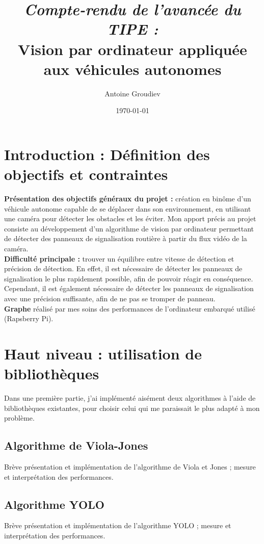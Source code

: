 \documentclass[12pt,a4paper]{article}
\author{Antoine Groudiev}
\title{\textit{Compte-rendu de l'avancée du TIPE :} \\ Vision par ordinateur appliquée aux véhicules autonomes}
\date{\today}
\begin{document}
\maketitle

\section*{Introduction : Définition des objectifs et contraintes}
\textbf{Présentation des objectifs généraux du projet :} création en binôme d'un véhicule autonome capable de se déplacer dans son environnement, en utilisant une caméra pour détecter les obstacles et les éviter. Mon apport précis au projet consiste au développement d'un algorithme de vision par ordinateur permettant de détecter des panneaux de signalisation routière à partir du flux vidéo de la caméra. \\

\textbf{Difficulté principale :} trouver un équilibre entre vitesse de détection et précision de détection. En effet, il est nécessaire de détecter les panneaux de signalisation le plus rapidement possible, afin de pouvoir réagir en conséquence. Cependant, il est également nécessaire de détecter les panneaux de signalisation avec une précision suffisante, afin de ne pas se tromper de panneau. \\

\textbf{Graphe} réalisé par mes soins des performances de l'ordinateur embarqué utilisé (Rapsberry Pi).

\section{Haut niveau : utilisation de bibliothèques}
Dans une première partie, j'ai implémenté aisément deux algorithmes à l'aide de bibliothèques existantes, pour choisir celui qui me paraissait le plus adapté à mon problème.

\subsection{Algorithme de Viola-Jones}
Brève présentation et implémentation de l'algorithme de Viola et Jones ; mesure et interprétation des performances.

\subsection{Algorithme YOLO}
Brève présentation et implémentation de l'algorithme YOLO ; mesure et interprétation des performances. \\
\end{document}
